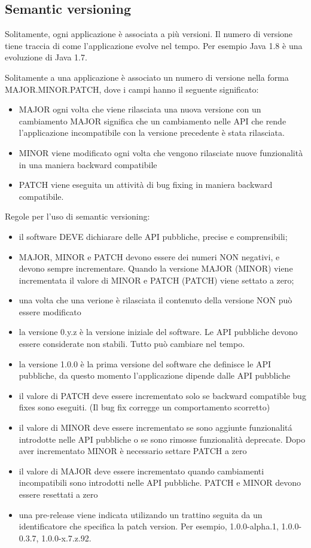 \documentclass{article}
\theoremstyle{definition}
\begin{document}
\subsection{Semantic versioning}
Solitamente, ogni applicazione \`e associata a pi\`u versioni. Il numero di versione tiene traccia di come l'applicazione evolve nel tempo.
Per esempio Java 1.8 \`e una evoluzione di Java 1.7.

Solitamente a una applicazione \`e associato un numero di versione nella forma MAJOR.MINOR.PATCH, dove i campi hanno il seguente significato:
\begin{itemize}
\item MAJOR ogni volta che viene rilasciata una nuova versione con un cambiamento MAJOR significa che un cambiamento nelle API che rende l'applicazione incompatibile con la versione precedente \`e stata rilasciata. 
\item MINOR viene modificato ogni volta che vengono rilasciate nuove funzionalit\`a in una maniera backward compatibile
\item PATCH viene eseguita un attivit\`a di bug fixing in maniera backward compatibile.
\end{itemize}

Regole per l'uso di semantic versioning:
\begin{itemize}
\item il software DEVE dichiarare delle API pubbliche, precise e comprensibili;
\item MAJOR, MINOR e PATCH devono essere dei numeri NON negativi, e devono sempre incrementare. Quando la versione MAJOR (MINOR) viene incrementata il valore di MINOR e PATCH (PATCH) viene settato a zero;
\item una volta che una verione \`e rilasciata il contenuto della versione NON pu\`o essere modificato
\item la versione 0.y.z \`e la versione iniziale del software. Le API pubbliche devono essere considerate non stabili. Tutto pu\`o cambiare nel tempo.
\item la versione 1.0.0 \`e la prima versione del software che definisce le API pubbliche, da questo momento l'applicazione dipende dalle API pubbliche
\item il valore di PATCH deve essere incrementato solo se backward compatible bug fixes sono eseguiti. (Il bug fix corregge un comportamento scorretto)
\item il valore di MINOR deve essere incrementato se sono aggiunte funzionalit\'a introdotte nelle API pubbliche o se sono rimosse funzionalit\`a deprecate. Dopo aver incrementato MINOR \`e necessario settare PATCH a zero
\item il valore di MAJOR deve essere incrementato quando cambiamenti incompatibili sono introdotti nelle API pubbliche. PATCH e MINOR devono essere resettati a zero
\item una pre-release viene indicata utilizando un trattino seguita da un identificatore che specifica la patch version. Per esempio, 1.0.0-alpha.1, 1.0.0-0.3.7, 1.0.0-x.7.z.92. 
\end{itemize}
\end{document}
